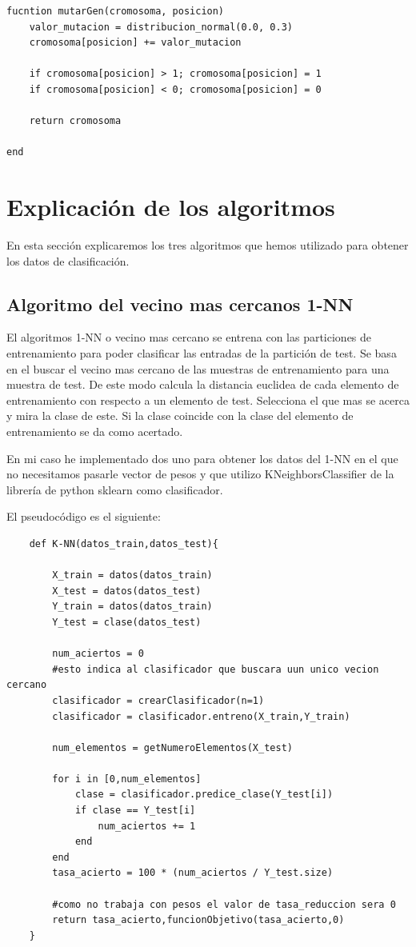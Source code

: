 \documentclass[titlepage]{article}
\begin{document}
	\begin{lstlisting}
fucntion mutarGen(cromosoma, posicion)
	valor_mutacion = distribucion_normal(0.0, 0.3)
	cromosoma[posicion] += valor_mutacion
	
	if cromosoma[posicion] > 1; cromosoma[posicion] = 1	
	if cromosoma[posicion] < 0; cromosoma[posicion] = 0
	
	return cromosoma

end
	\end{lstlisting}
	
	\section{Explicación de los algoritmos}
	En esta sección explicaremos los tres algoritmos que hemos utilizado para obtener los datos de clasificación.
	
	\subsection{Algoritmo del vecino mas cercanos 1-NN}
	El algoritmos 1-NN o vecino mas cercano se entrena con las particiones de entrenamiento para poder clasificar las entradas de la partición de test. Se basa en el buscar el vecino mas cercano de las muestras de entrenamiento para una muestra de test. De este modo calcula la distancia euclidea de cada elemento de entrenamiento con respecto a un elemento de test. Selecciona el que mas se acerca y mira la clase de este. Si la clase coincide con la clase del elemento de entrenamiento se da como acertado.
	
	En mi caso he implementado dos uno para obtener los datos del 1-NN en el que no necesitamos pasarle vector de pesos y que utilizo KNeighborsClassifier de la librería de python sklearn como clasificador.
	
	El pseudocódigo es el siguiente:
	\begin{lstlisting}
	def K-NN(datos_train,datos_test){
	
		X_train = datos(datos_train)
		X_test = datos(datos_test)
		Y_train = datos(datos_train)
		Y_test = clase(datos_test)
		
		num_aciertos = 0
		#esto indica al clasificador que buscara uun unico vecion cercano
		clasificador = crearClasificador(n=1)
		clasificador = clasificador.entreno(X_train,Y_train)
		
		num_elementos = getNumeroElementos(X_test)
		
		for i in [0,num_elementos]
			clase = clasificador.predice_clase(Y_test[i])
			if clase == Y_test[i]
				num_aciertos += 1
			end
		end
		tasa_acierto = 100 * (num_aciertos / Y_test.size)
		
		#como no trabaja con pesos el valor de tasa_reduccion sera 0
		return tasa_acierto,funcionObjetivo(tasa_acierto,0)
	}
	\end{lstlisting}
	
\end{document}

